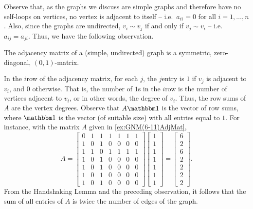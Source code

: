 Observe that, as the graphs we discuss are simple graphs and therefore have no self-loops on vertices, no vertex is adjacent to itself -- i.e.\ $a_{ii} = 0$ for all $i = 1, \ldots, n$. Also, since the graphs are undirected, $v_i \sim v_j$ if and only if $v_j \sim v_i$ -- i.e.\ $a_{ij} = a_{ji}$. Thus, we have the following observation.

\begin{Observation}
The adjacency matrix of a (simple, undirected) graph is a symmetric, zero-diagonal, $(0, 1)$-matrix.
\end{Observation}

In the $i$\nth row of the adjacency matrix, for each $j$, the $j$\nth entry is $1$ if $v_j$ is adjacent to $v_i$, and $0$ otherwise. That is, the number of $1$s in the $i$\nth row is the number of vertices adjacent to $v_i$, or in other words, the degree of $v_i$. Thus, the row sums of $A$ are the vertex degrees. Observe that $A \mathbbm 1$ is the vector of row sums, where $\mathbbm 1$ is the vector (of suitable size) with all entries equal to $1$. For instance, with the matrix $A$ given in \cref{ex:GNM(6-11)AdjMat},
\begin{equation*}
A = \begin{bmatrix}
0 & 1 & 1 & 1 & 1 & 1 & 1 \\
1 & 0 & 1 & 0 & 0 & 0 & 0 \\
1 & 1 & 0 & 1 & 1 & 1 & 1 \\
1 & 0 & 1 & 0 & 0 & 0 & 0 \\
1 & 0 & 1 & 0 & 0 & 0 & 0 \\
1 & 0 & 1 & 0 & 0 & 0 & 0 \\
1 & 0 & 1 & 0 & 0 & 0 & 0
\end{bmatrix}
\begin{bmatrix}
1 \\ 1 \\ 1 \\ 1 \\ 1 \\ 1 \\ 1
\end{bmatrix} =
\begin{bmatrix}
6 \\ 2 \\ 6 \\ 2 \\ 2 \\ 2 \\ 2
\end{bmatrix}.
\end{equation*}
From the Handshaking Lemma and the preceding observation, it follows that the sum of all entries of $A$ is twice the number of edges of the graph.

